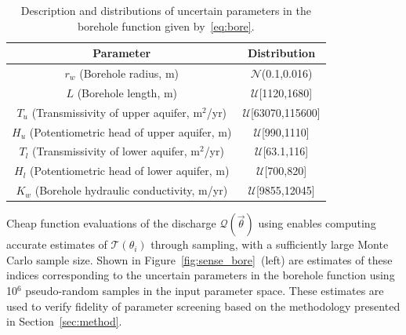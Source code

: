 \begin{table}[htbp]
\renewcommand*{\arraystretch}{1.2}
\begin{center}
\begin{tabular}{|c|c|}
\hline
Parameter & Distribution \\ \hline \hline
$r_w$ (Borehole radius, m) & $\mathcal{N}$(0.1,0.016) \\
$L$ (Borehole length, m) & $\mathcal{U}$[1120,1680] \\
$T_u$ (Transmissivity of upper aquifer, m$^2$/yr) & $\mathcal{U}$[63070,115600] \\
$H_u$ (Potentiometric head of upper aquifer, m) & $\mathcal{U}$[990,1110] \\
$T_l$ (Transmissivity of lower aquifer, m$^2$/yr) & $\mathcal{U}$[63.1,116] \\
$H_l$ (Potentiometric head of lower aquifer, m) & $\mathcal{U}$[700,820] \\
$K_w$ (Borehole hydraulic conductivity, m/yr) & $\mathcal{U}$[9855,12045] \\
\hline
\end{tabular}
\end{center}

\caption{Description and distributions of uncertain parameters in the borehole function
given by~\eqref{eq:bore}.}
\label{tab:bore}
\end{table}

Cheap function evaluations of the discharge $\mathcal{Q}(\vec{\theta})$ using
enables computing accurate estimates of $\mathcal{T}(\theta_i)$ through
sampling, with a sufficiently large Monte Carlo sample size.  Shown in
Figure~\ref{fig:sense_bore}~(left) are estimates of these indices corresponding to the
uncertain parameters in the borehole function using 10$^6$ pseudo-random
samples in the input parameter space. 
These estimates are used to verify fidelity of
parameter screening based on the methodology presented in Section~\ref{sec:method}. 

